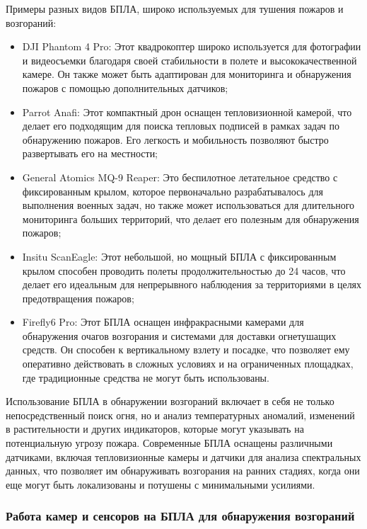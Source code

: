 Примеры разных видов БПЛА, широко используемых для тушения пожаров и возгораний:
\begin{itemize}
	\item DJI Phantom 4 Pro: Этот квадрокоптер широко используется для фотографии и видеосъемки благодаря своей стабильности в полете и высококачественной камере. Он также может быть адаптирован для мониторинга и обнаружения пожаров с помощью дополнительных датчиков;
	\item Parrot Anafi: Этот компактный дрон оснащен тепловизионной камерой, что делает его подходящим для поиска тепловых подписей в рамках задач по обнаружению пожаров. Его легкость и мобильность позволяют быстро развертывать его на местности;
	\item General Atomics MQ-9 Reaper: Это беспилотное летательное средство с фиксированным крылом, которое первоначально разрабатывалось для выполнения военных задач, но также может использоваться для длительного мониторинга больших территорий, что делает его полезным для обнаружения пожаров;
	\item Insitu ScanEagle: Этот небольшой, но мощный БПЛА с фиксированным крылом способен проводить полеты продолжительностью до 24 часов, что делает его идеальным для непрерывного наблюдения за территориями в целях предотвращения пожаров;
	\item Firefly6 Pro: Этот БПЛА оснащен инфракрасными камерами для обнаружения очагов возгорания и системами для доставки огнетушащих средств. Он способен к вертикальному взлету и посадке, что позволяет ему оперативно действовать в сложных условиях и на ограниченных площадках, где традиционные средства не могут быть использованы.
\end{itemize}

Использование БПЛА в обнаружении возгораний включает в себя не только непосредственный поиск огня, но и анализ температурных аномалий, изменений в растительности и других индикаторов, которые могут указывать на потенциальную угрозу пожара. Современные БПЛА оснащены различными датчиками, включая тепловизионные камеры и датчики для анализа спектральных данных, что позволяет им обнаруживать возгорания на ранних стадиях, когда они еще могут быть локализованы и потушены с минимальными усилиями.
\subsubsection{Работа камер и сенсоров на БПЛА для обнаружения возгораний}
